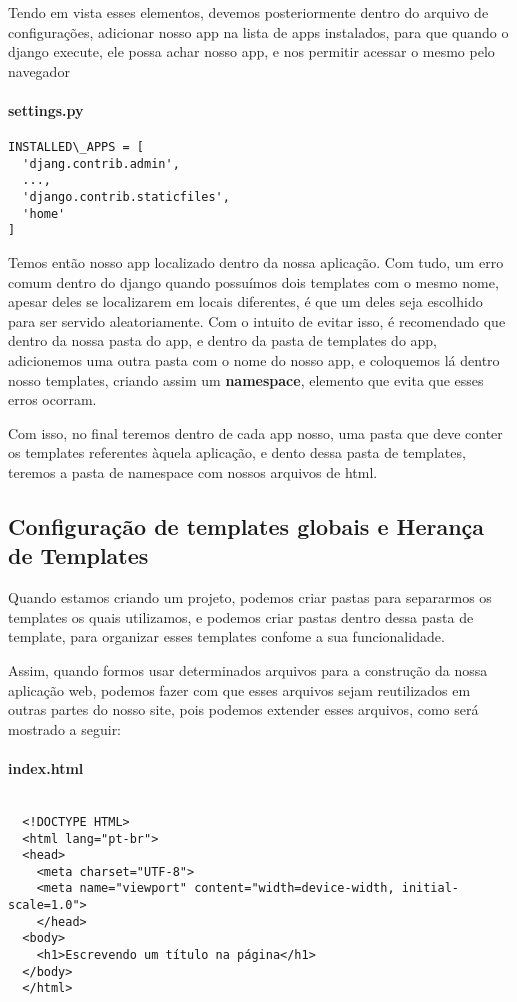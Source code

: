\documentclass[12pt, a4paper]{paper}
\begin{document}
Tendo em vista esses elementos, devemos posteriormente dentro do arquivo de 
configurações, adicionar nosso app na lista de apps instalados, para que quando
o django execute, ele possa achar nosso app, e nos permitir acessar o mesmo
pelo navegador


\paragraph{settings.py} %
\label{par:settings.py}
\begin{verbatim}
INSTALLED\_APPS = [
  'djang.contrib.admin',
  ...,
  'django.contrib.staticfiles',
  'home'
]
\end{verbatim}

Temos então nosso app localizado dentro da nossa aplicação. Com tudo, um erro 
comum dentro do django quando possuímos dois templates com o mesmo nome, apesar 
deles se localizarem em locais diferentes, é que um deles seja escolhido  para 
ser servido aleatoriamente. Com o intuito de evitar isso, é recomendado que dentro 
da nossa pasta do app, e dentro da pasta de templates do app, adicionemos uma outra 
pasta com o nome do nosso app, e coloquemos lá dentro nosso templates, criando assim 
um \textbf{namespace}, elemento que evita que esses erros ocorram.

Com isso, no final teremos dentro de cada app nosso, uma pasta que deve conter os 
templates referentes àquela aplicação, e dento dessa pasta de templates, teremos a 
pasta de namespace com nossos arquivos de html.

\subsection{Configuração de templates globais e Herança de Templates} %
\label{sub:Configuração de templates globais e Herança de Templates}
Quando estamos criando um projeto, podemos criar pastas para separarmos os templates 
os quais utilizamos, e podemos criar pastas dentro dessa pasta de template, para 
organizar esses templates confome a sua funcionalidade. 

Assim, quando formos usar determinados arquivos para a construção da nossa aplicação 
web, podemos fazer com que esses arquivos sejam reutilizados em outras partes do nosso site, pois podemos extender esses arquivos, como será mostrado a seguir: 


\paragraph{index.html} %
\label{par:index.html}
\begin{verbatim}
  
  <!DOCTYPE HTML>
  <html lang="pt-br">
  <head>
    <meta charset="UTF-8">
    <meta name="viewport" content="width=device-width, initial-scale=1.0">
    </head>
  <body>
    <h1>Escrevendo um título na página</h1>
  </body>
  </html>
\end{verbatim}
\end{document}

